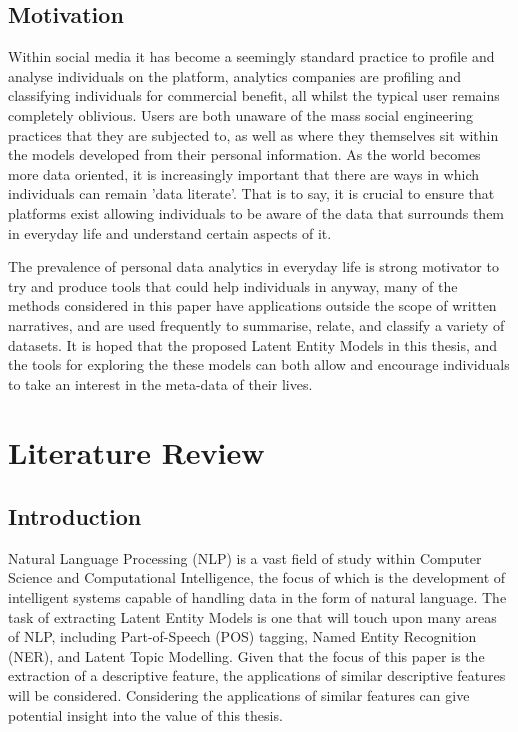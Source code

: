 \documentclass[10pt]{report}
\begin{document}
\section{Motivation}
Within social media it has become a seemingly standard practice to profile and analyse individuals on the platform, analytics companies are profiling and classifying individuals for commercial benefit, all whilst the typical user remains completely oblivious. Users are both unaware of the mass social engineering practices that they are subjected to, as well as where they themselves sit within the models developed from their personal information. As the world becomes more data oriented, it is increasingly important that there are ways in which individuals can remain 'data literate'. That is to say, it is crucial to ensure that platforms exist allowing individuals to be aware of the data that surrounds them in everyday life and understand certain aspects of it.

The prevalence of personal data analytics in everyday life is strong motivator to try and produce tools that could help individuals in anyway, many of the methods considered in this paper have applications outside the scope of written narratives, and are used frequently to summarise, relate, and classify a variety of datasets. It is hoped that the proposed Latent Entity Models in this thesis, and the tools for exploring the these models can both allow and encourage individuals to take an interest in the meta-data of their lives.

%
%
%
%
\chapter{Literature Review}

\section{Introduction}
Natural Language Processing (NLP) is a vast field of study within Computer Science and Computational Intelligence, the focus of which is the development of intelligent systems capable of handling data in the form of natural language. The task of extracting Latent Entity Models is one that will touch upon many areas of NLP, including Part-of-Speech (POS) tagging, Named Entity Recognition (NER), and Latent Topic Modelling. Given that the focus of this paper is the extraction of a descriptive feature, the applications of similar descriptive features will be considered. Considering the applications of similar features can give potential insight into the value of this thesis.
\end{document}
